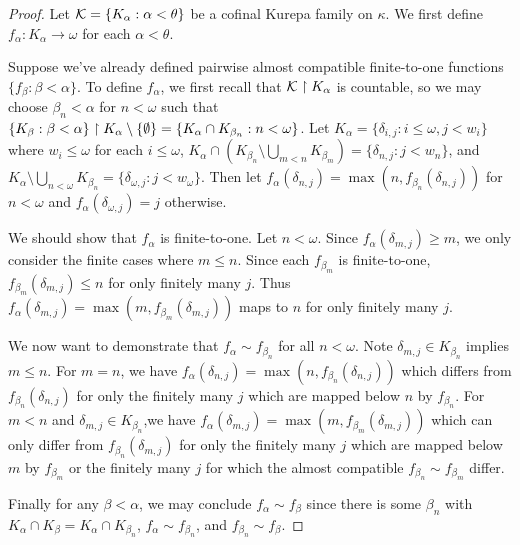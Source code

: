 \documentclass{rmmcart}
\theoremstyle{plain}
\theoremstyle{definition}
\theoremstyle{remark}
\theoremstyle{plain}
\theoremstyle{definition}
\theoremstyle{remark}
\begin{document}
  \begin{proof}
    Let \(\mathcal{K}=\{K_\alpha:\alpha<\theta\}\)
    be a cofinal Kurepa family on \(\kappa\).
    We first define \(f_\alpha:K_\alpha\to\omega\) for each \(\alpha<\theta\).

    Suppose we've already defined pairwise almost compatible finite-to-one functions
    \(\{f_\beta:\beta<\alpha\}\). To define
    \(f_\alpha\), we first recall that \(\mathcal{K}\restriction K_\alpha\) is countable,
    so we may choose \(\beta_n<\alpha\) for \(n<\omega\) such that
    \(
      \{K_\beta:\beta<\alpha\}\restriction K_\alpha \setminus \{\emptyset\}
        =
      \{K_\alpha\cap K_{\beta_n}:n<\omega\}
    \).
    Let \(K_\alpha=\{\delta_{i,j}:i\leq\omega,j<w_i\}\) where
    \(w_i\leq\omega\) for each \(i\leq\omega\),
    \(
      K_\alpha\cap \left(K_{\beta_n}\setminus\bigcup_{m<n}K_{\beta_m}\right)
        =
      \{\delta_{n,j}:j<w_n\}
    \),
    and
    \(
      K_\alpha\setminus\bigcup_{n<\omega}K_{\beta_n}
        =
      \{
        \delta_{\omega,j}:j<w_\omega
      \}
    \).
    Then let \(f_\alpha(\delta_{n,j})=\max(n,f_{\beta_n}(\delta_{n,j}))\) for
    \(n<\omega\) and \(f_\alpha(\delta_{\omega,j})=j\) otherwise.

    We should show that \(f_\alpha\) is finite-to-one. Let \(n<\omega\).
    Since \(f_\alpha(\delta_{m,j})\geq m\), we only consider the finite cases
    where \(m\leq n\). Since each
    \(f_{\beta_m}\) is finite-to-one, \(f_{\beta_m}(\delta_{m,j})\leq n\)
    for only finitely many \(j\). Thus
    \(f_\alpha(\delta_{m,j})=\max(m,f_{\beta_m}(\delta_{m,j}))\) maps to
    \(n\) for only finitely many \(j\).

    We now want to demonstrate that \(f_\alpha\sim f_{\beta_n}\) for all
    \(n<\omega\). Note \(\delta_{m,j}\in K_{\beta_n}\) implies
    \(m\leq n\).
    For \(m=n\), we have
    \(f_\alpha(\delta_{n,j})=\max(n,f_{\beta_n}(\delta_{n,j}))\) which differs
    from \(f_{\beta_n}(\delta_{n,j})\) for only the finitely many \(j\) which
    are mapped below \(n\) by \(f_{\beta_n}\).
    For \(m<n\) and \(\delta_{m,j}\in K_{\beta_n}\),we have
    \(f_\alpha(\delta_{m,j})=\max(m,f_{\beta_m}(\delta_{m,j}))\) which can
    only differ
    from \(f_{\beta_n}(\delta_{m,j})\) for only the finitely many \(j\) which
    are mapped below \(m\) by \(f_{\beta_m}\) or the finitely many \(j\)
    for which the
    almost compatible \(f_{\beta_n}\sim f_{\beta_m}\) differ.

    Finally for any \(\beta<\alpha\), we may conclude \(f_\alpha\sim f_\beta\)
    since there is some \(\beta_n\) with
    \(K_\alpha\cap K_\beta=K_\alpha\cap K_{\beta_n}\),
    \(f_\alpha\sim f_{\beta_n}\), and \(f_{\beta_n}\sim f_\beta\).
  \end{proof}
\end{document}
